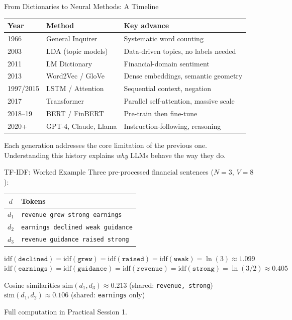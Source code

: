 \documentclass[9pt,t]{beamer}
\begin{document}
\begin{frame}[noframenumbering]{From Dictionaries to Neural Methods: A Timeline}
  \begin{center}
  \begin{tabular}{@{}lll@{}}
    \toprule
    Year & Method & Key advance \\
    \midrule
    1966       & General Inquirer       & Systematic word counting \\
    2003       & LDA (topic models)     & Data-driven topics, no labels needed \\
    2011       & LM Dictionary          & Financial-domain sentiment \\
    2013       & Word2Vec / GloVe       & Dense embeddings, semantic geometry \\
    1997/2015  & LSTM / Attention       & Sequential context, negation \\
    2017       & Transformer            & Parallel self-attention, massive scale \\
    2018--19   & BERT / FinBERT         & Pre-train then fine-tune \\
    2020+      & GPT-4, Claude, Llama   & Instruction-following, reasoning \\
    \bottomrule
  \end{tabular}
  \end{center}
  \medskip
  Each generation addresses the core limitation of the previous one.\\
  Understanding this history explains \emph{why} LLMs behave the way they do.
\end{frame}

\begin{frame}[noframenumbering]{TF-IDF: Worked Example}
  Three pre-processed financial sentences ($N=3$, $V=8$):
  \medskip
  \begin{center}
  \begin{tabular}{@{}cl@{}}
    \toprule
    $d$ & Tokens \\
    \midrule
    $d_1$ & \texttt{revenue grew strong earnings} \\
    $d_2$ & \texttt{earnings declined weak guidance} \\
    $d_3$ & \texttt{revenue guidance raised strong} \\
    \bottomrule
  \end{tabular}
  \end{center}
  \medskip
  $\mathrm{idf}(\texttt{declined}) = \mathrm{idf}(\texttt{grew}) = \mathrm{idf}(\texttt{raised})
  = \mathrm{idf}(\texttt{weak}) = \ln(3) \approx 1.099$\\
  $\mathrm{idf}(\texttt{earnings}) = \mathrm{idf}(\texttt{guidance}) = \mathrm{idf}(\texttt{revenue})
  = \mathrm{idf}(\texttt{strong}) = \ln(3/2) \approx 0.405$
  \medskip
  \begin{block}{Cosine similarities}
    $\mathrm{sim}(d_1, d_3) \approx 0.213$ (shared: \texttt{revenue, strong})\\
    $\mathrm{sim}(d_1, d_2) \approx 0.106$ (shared: \texttt{earnings} only)
  \end{block}
  Full computation in Practical Session 1.
\end{frame}
\end{document}
